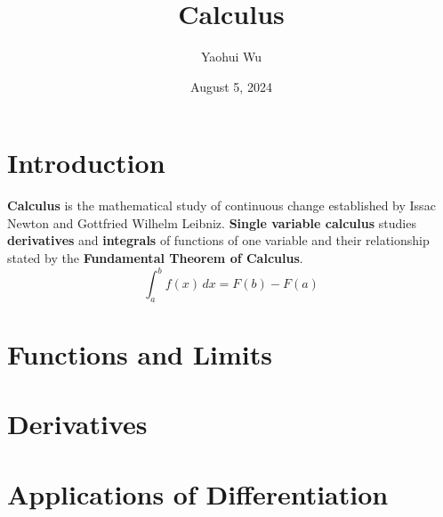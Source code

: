 \documentclass[12pt]{article}
\title{Calculus}
\author{Yaohui Wu}
\date{August 5, 2024}
\begin{document}
\maketitle

\section*{Introduction}

\textbf{Calculus} is the mathematical study of continuous change established
by Issac Newton and Gottfried Wilhelm Leibniz.
\textbf{Single variable calculus} studies \textbf{derivatives} and
\textbf{integrals} of functions of one variable and their relationship stated
by the \textbf{Fundamental Theorem of Calculus}.
\[\int_a^b f(x)\,dx=F(b)-F(a)\]

\tableofcontents
\newpage

\section{Functions and Limits}







\section{Derivatives}













\section{Applications of Differentiation}







\end{document}
